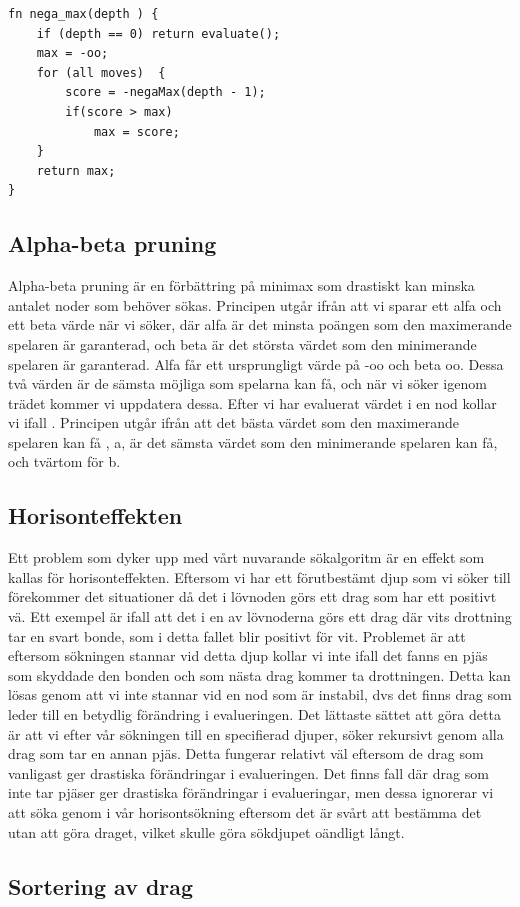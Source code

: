 \message{ !name(main.tex)}\documentclass{article}
\begin{document}
\begin{verbatim}
fn nega_max(depth ) {
    if (depth == 0) return evaluate();
    max = -oo;
    for (all moves)  {
        score = -negaMax(depth - 1);
        if(score > max)
            max = score;
    }
    return max;
}
\end{verbatim}

\subsection{Alpha-beta pruning}
Alpha-beta pruning är en förbättring på minimax som drastiskt kan minska antalet noder som behöver sökas. Principen utgår ifrån att vi sparar ett alfa och ett beta värde när vi söker, där alfa är det minsta poängen som den maximerande spelaren är garanterad, och beta är det största värdet som den minimerande spelaren är garanterad. Alfa får ett ursprungligt värde på -oo och beta oo. Dessa två värden är de sämsta möjliga som spelarna kan få, och när vi söker igenom trädet kommer vi uppdatera dessa. Efter vi har evaluerat värdet i en nod kollar vi ifall . Principen utgår ifrån att det bästa värdet som den maximerande spelaren kan få , a, är det sämsta värdet som den minimerande spelaren kan få, och tvärtom för b.

\subsection{Horisonteffekten}

Ett problem som dyker upp med vårt nuvarande sökalgoritm är en effekt som kallas för horisonteffekten. Eftersom vi har ett förutbestämt djup som vi söker till förekommer det situationer då det i lövnoden görs ett drag som har ett positivt vä. Ett exempel är ifall att det i en av lövnoderna görs ett drag där vits drottning tar en svart bonde, som i detta fallet blir positivt för vit. Problemet är att eftersom sökningen stannar vid detta djup kollar vi inte ifall det fanns en pjäs som skyddade den bonden och som nästa drag kommer ta drottningen. Detta kan lösas genom att vi inte stannar vid en nod som är instabil, dvs det finns drag som leder till en betydlig förändring i evalueringen. Det lättaste sättet att göra detta är att vi efter vår sökningen till en specifierad djuper, söker rekursivt genom alla drag som tar en annan pjäs. Detta fungerar relativt väl eftersom de drag som vanligast ger drastiska förändringar i evalueringen. Det finns fall där drag som inte tar pjäser ger drastiska förändringar i evalueringar, men dessa ignorerar vi att söka genom i vår horisontsökning eftersom det är svårt att bestämma det utan att göra draget, vilket skulle göra sökdjupet oändligt långt.

\subsection{Sortering av drag}

\

\begin{thebibliography}{9}

\end{thebibliography}
\end{document}
